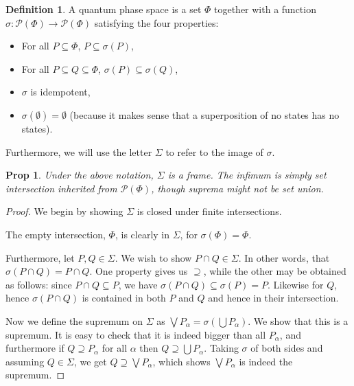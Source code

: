 \documentclass{article}
\theoremstyle{definition}
\newtheorem{definition}{Definition}
\theoremstyle{plain}
\newtheorem{prop}{Prop}
\newcommand{\ps}{\mathcal{P}}
\begin{document}
\begin{definition}
A quantum phase space is a set $\Phi$ together with a function $\sigma : \ps(\Phi) \to \ps(\Phi)$ satisfying the four properties:
\begin{itemize}
\item For all $P \subseteq \Phi$, $P \subseteq \sigma(P)$,
\item For all $P \subseteq Q \subseteq \Phi$, $\sigma(P) \subseteq \sigma(Q)$,
\item $\sigma$ is idempotent,
\item $\sigma(\emptyset) = \emptyset$ (because it makes sense that a superposition of no states has no states).
\end{itemize}

Furthermore, we will use the letter $\Sigma$ to refer to the image of $\sigma$.
\end{definition}

\begin{prop}
Under the above notation, $\Sigma$ is a frame. The infimum is simply set intersection inherited from $\ps(\Phi)$, though suprema might not be set union.
\end{prop}

\begin{proof}
We begin by showing $\Sigma$ is closed under finite intersections.

The empty intersection, $\Phi$, is clearly in $\Sigma$, for $\sigma(\Phi) = \Phi$.

Furthermore, let $P, Q \in \Sigma$. We wish to show $P \cap Q \in \Sigma$. In other words, that $\sigma(P \cap Q) = P \cap Q$. One property gives us $\supseteq$, while the other may be obtained as follows: since $P \cap Q \subseteq P$, we have $\sigma(P \cap Q) \subseteq \sigma(P) = P$. Likewise for $Q$, hence $\sigma(P \cap Q)$ is contained in both $P$ and $Q$ and hence in their intersection.

Now we define the supremum on $\Sigma$ as $\bigvee P_\alpha = \sigma(\bigcup P_\alpha)$. We show that this is a supremum. It is easy to check that it is indeed bigger than all $P_\alpha$, and furthermore if $Q \supseteq P_\alpha$ for all $\alpha$ then $Q \supseteq \bigcup P_\alpha$. Taking $\sigma$ of both sides and assuming $Q \in \Sigma$, we get $Q \supseteq \bigvee P_\alpha$, which shows $\bigvee P_\alpha$ is indeed the supremum.
\end{proof}
\end{document}
